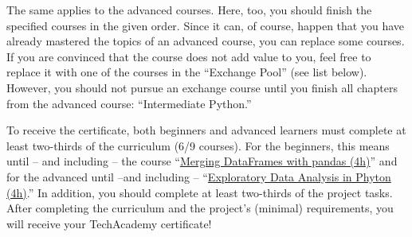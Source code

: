 \documentclass[
  11pt,
]{article}
\begin{document}
The same applies to the advanced courses.
Here, too, you should finish the specified courses in the given order.
Since it can, of course, happen that you have already mastered the topics of an advanced course, you can replace some courses.
If you are convinced that the course does not add value to you, feel free to replace it with one of the courses in the ``Exchange Pool'' (see list below).
However, you should not pursue an exchange course until you finish all chapters from the advanced course: ``Intermediate Python.''

To receive the certificate, both beginners and advanced learners must complete at least two-thirds of the curriculum (6/9 courses).
For the beginners, this means until -- and including -- the course ``\href{https://learn.datacamp.com/courses/merging-dataframes-with-pandas}{Merging DataFrames with pandas (4h)}'' and for the advanced until --and including -- ``\href{https://learn.datacamp.com/courses/exploratory-data-analysis-in-python}{Exploratory Data Analysis in Phyton (4h)}.'' In addition, you should complete at least two-thirds of the project tasks.
After completing the curriculum and the project's (minimal) requirements, you will receive your TechAcademy certificate!
\end{document}

